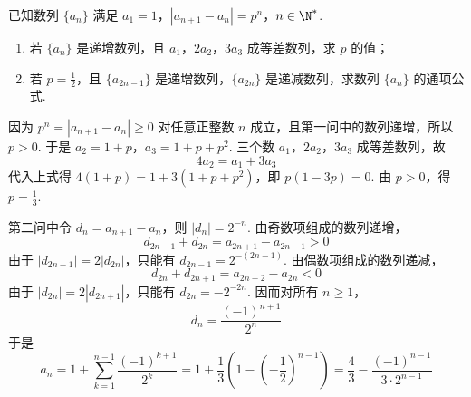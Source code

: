 \begin{problem}
已知数列 \(\{a_{n}\}\) 满足 \(a_1 = 1\)，\(|a_{n + 1} - a_n| = p^n\)，\(n \in \N^*\).

\begin{enumerate}
\item 若 \(\{a_n\}\) 是递增数列，且 \(a_1\)，\(2a_2\)，\(3a_3\) 成等差数列，求 \(p\) 的值；
\item 若 \(p = \frac{1}{2}\)，且 \(\{a_{2n-1}\}\) 是递增数列，\(\{a_{2n}\}\) 是递减数列，求数列 \(\{a_n\}\) 的通项公式.
\end{enumerate}

\begin{solution}
因为 \(p^n=|a_{n+1}-a_n|\geqslant0\) 对任意正整数 \(n\) 成立，且第一问中的数列递增，所以 \(p>0\). 于是
\(a_2=1+p\)，\(a_3=1+p+p^2\).
三个数 \(a_1\)，\(2a_2\)，\(3a_3\) 成等差数列，故
\[
4a_2=a_1+3a_3
\]
代入上式得 \(4(1+p)=1+3(1+p+p^2)\)，即 \(p(1-3p)=0\). 由 \(p>0\)，得 \(p=\frac13\).

第二问中令 \(d_n=a_{n+1}-a_n\)，则 \(|d_n|=2^{-n}\). 由奇数项组成的数列递增，
\[
d_{2n-1}+d_{2n}=a_{2n+1}-a_{2n-1}>0
\]
由于 \(|d_{2n-1}|=2|d_{2n}|\)，只能有 \(d_{2n-1}=2^{-(2n-1)}\). 由偶数项组成的数列递减，
\[
d_{2n}+d_{2n+1}=a_{2n+2}-a_{2n}<0
\]
由于 \(|d_{2n}|=2|d_{2n+1}|\)，只能有 \(d_{2n}=-2^{-2n}\). 因而对所有 \(n\geqslant1\)，
\[
d_n=\frac{(-1)^{n+1}}{2^n}
\]
于是
\[
a_n=1+\sum_{k=1}^{n-1}\frac{(-1)^{k+1}}{2^k}
=1+\frac{1}{3}\left(1-\left(-\frac12\right)^{n-1}\right)
=\frac43-\frac{(-1)^{n-1}}{3\cdot2^{n-1}}
\]
\end{solution}
\end{problem}

